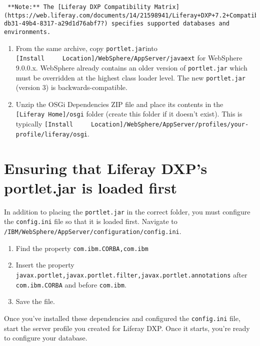 \noindent\hrulefill

\begin{verbatim}
 **Note:** The [Liferay DXP Compatibility Matrix](https://web.liferay.com/documents/14/21598941/Liferay+DXP+7.2+Compatibility+Matrix/b6e0f064-db31-49b4-8317-a29d1d76abf7?) specifies supported databases and environments.
\end{verbatim}

\noindent\hrulefill

\begin{enumerate}
\def\labelenumi{\arabic{enumi}.}
\setcounter{enumi}{1}
\item
  From the same archive, copy \texttt{portlet.jar}into
  \texttt{{[}Install\ \ \ \ \ Location{]}/WebSphere/AppServer/javaext}
  for WebSphere 9.0.0.x. WebSphere already contains an older version of
  \texttt{portlet.jar} which must be overridden at the highest class
  loader level. The new \texttt{portlet.jar} (version 3) is
  backwards-compatible.
\item
  Unzip the OSGi Dependencies ZIP file and place its contents in the
  \texttt{{[}Liferay\ Home{]}/osgi} folder (create this folder if it
  doesn't exist). This is typically
  \texttt{{[}Install\ \ \ \ \ Location{]}/WebSphere/AppServer/profiles/your-profile/liferay/osgi}.
\end{enumerate}

\section{Ensuring that Liferay DXP's portlet.jar is loaded
first}\label{ensuring-that-liferay-dxps-portlet.jar-is-loaded-first}

In addition to placing the \texttt{portlet.jar} in the correct folder,
you must configure the \texttt{config.ini} file so that it is loaded
first. Navigate to
\texttt{/IBM/WebSphere/AppServer/configuration/config.ini}.

\begin{enumerate}
\def\labelenumi{\arabic{enumi}.}
\item
  Find the property \texttt{com.ibm.CORBA,com.ibm}
\item
  Insert the property
  \texttt{javax.portlet,javax.portlet.filter,javax.portlet.annotations}
  after \texttt{com.ibm.CORBA} and before \texttt{com.ibm}.
\item
  Save the file.
\end{enumerate}

Once you've installed these dependencies and configured the
\texttt{config.ini} file, start the server profile you created for
Liferay DXP. Once it starts, you're ready to configure your database.

